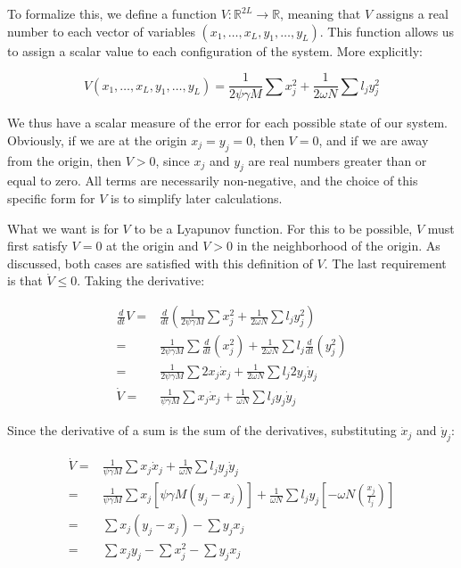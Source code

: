To formalize this, we define a function $V:\mathbb{R}^{2L}\rightarrow\mathbb{R}$, meaning that $V$ assigns a real number to each vector of variables $\left(x_{1},\dots,x_{L},y_{1},\dots,y_{L}\right)$. This function allows us to assign a scalar value to each configuration of the system. More explicitly:

$$
V\left(x_{1},\dots,x_{L},y_{1},\dots,y_{L}\right)=\frac{1}{2\psi\gamma M}\sum x_{j}^{2}+\frac{1}{2\omega N}\sum l_{j}y_{j}^{2}
$$

We thus have a scalar measure of the error for each possible state of our system. Obviously, if we are at the origin $x_{j}=y_{j}=0$, then $V=0$, and if we are away from the origin, then $V>0$, since $x_{j}$ and $y_{j}$ are real numbers greater than or equal to zero. All terms are necessarily non-negative, and the choice of this specific form for $V$ is to simplify later calculations.  

What we want is for $V$ to be a Lyapunov function. For this to be possible, $V$ must first satisfy $V=0$ at the origin and $V>0$ in the neighborhood of the origin. As discussed, both cases are satisfied with this definition of $V$. The last requirement is that $\dot{V}\leq0$. Taking the derivative:


\begin{align*}
\frac{d}{dt}V= & \frac{d}{dt}\left(\frac{1}{2\psi\gamma M}\sum x_{j}^{2}+\frac{1}{2\omega N}\sum l_{j}y_{j}^{2}\right)\\
= & \frac{1}{2\psi\gamma M}\sum\frac{d}{dt}\left(x_{j}^{2}\right)+\frac{1}{2\omega N}\sum l_{j}\frac{d}{dt}\left(y_{j}^{2}\right)\\
= & \frac{1}{2\psi\gamma M}\sum2x_{j}\dot{x}_{j}+\frac{1}{2\omega N}\sum l_{j}2y_{j}\dot{y}_{j}\\
\dot{V}= & \frac{1}{\psi\gamma M}\sum x_{j}\dot{x}_{j}+\frac{1}{\omega N}\sum l_{j}y_{j}\dot{y}_{j}
\end{align*}

Since the derivative of a sum is the sum of the derivatives, substituting $\dot{x}_{j}$ and $\dot{y}_{j}$:

\begin{align*}
\dot{V}= & \frac{1}{\psi\gamma M}\sum x_{j}\dot{x}_{j}+\frac{1}{\omega N}\sum l_{j}y_{j}\dot{y}_{j}\\
= & \frac{1}{\psi\gamma M}\sum x_{j}\left[\psi\gamma M\left(y_{j}-x_{j}\right)\right]+\frac{1}{\omega N}\sum l_{j}y_{j}\left[-\omega N\left(\frac{x_{j}}{l_{j}}\right)\right]\\
= & \sum x_{j}\left(y_{j}-x_{j}\right)-\sum y_{j}x_{j}\\
= & \sum x_{j}y_{j}-\sum x_{j}^{2}-\sum y_{j}x_{j}
\end{align*}

